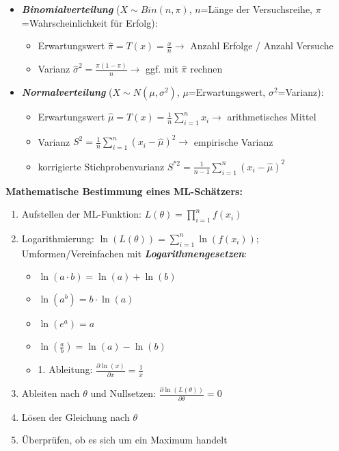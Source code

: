 \begin{itemize}
    \item \textbf{\emph{Binomialverteilung}} (\(X\sim Bin(n, \pi)\), \(n\)=Länge der Versuchsreihe, \(\pi\)=Wahrscheinlichkeit für Erfolg):
    \begin{itemize}
        \item Erwartungswert \(\hat{\pi}=T(x)=\frac{x}{n} \rightarrow \) Anzahl Erfolge / Anzahl Versuche
        \item Varianz \(\hat{\sigma}^2=\frac{\pi(1-\pi)}{n} \rightarrow \) ggf. mit \(\hat{\pi}\) rechnen
    \end{itemize}
    \item \textbf{\emph{Normalverteilung}} (\(X\sim N(\mu, \sigma^2)\), \(\mu\)=Erwartungswert, \(\sigma^2\)=Varianz):
    \begin{itemize}
        \item Erwartungswert \(\hat{\mu}=T(x)=\frac{1}{n}\sum_{i=1}^{n}x_i \rightarrow \) arithmetisches Mittel
        \item Varianz \(S^2=\frac{1}{n}\sum_{i=1}^{n}(x_i-\hat{\mu})^2 \rightarrow \) empirische Varianz
        \item korrigierte Stichprobenvarianz \(S^{*2}=\frac{1}{n-1}\sum_{i=1}^{n}(x_i-\hat{\mu})^2 \)
    \end{itemize}
\end{itemize}

\textbf{Mathematische Bestimmung eines ML-Schätzers:}

\begin{enumerate}
    \item Aufstellen der ML-Funktion: \(L(\theta)=\prod_{i=1}^{n}f(x_i)\)
    \item Logarithmierung: \(\ln(L(\theta))=\sum_{i=1}^{n}\ln(f(x_i))\); Umformen/Vereinfachen mit \textbf{\emph{Logarithmengesetzen}}:
        \begin{itemize}
            \item \(\ln(a\cdot b)=\ln(a)+\ln(b)\)
            \item \(\ln(a^b)=b\cdot\ln(a)\)
            \item \(\ln(e^a)=a\)
            \item \(\ln(\frac{a}{b})=\ln(a)-\ln(b)\)
            \item 1. Ableitung: \(\frac{\partial \ln(x)}{\partial x} = \frac{1}{x}\)
        \end{itemize}
    \item Ableiten nach \(\theta\) und Nullsetzen: \(\frac{\partial \ln(L(\theta))}{\partial \theta}=0\)
    \item Lösen der Gleichung nach \(\theta\)
    \item Überprüfen, ob es sich um ein Maximum handelt
\end{enumerate}


